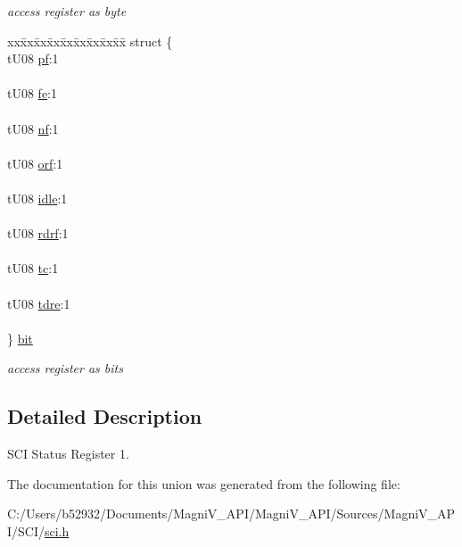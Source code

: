 \begin{DoxyCompactItemize}
\begin{DoxyCompactList}\small\item\em access register as byte \end{DoxyCompactList}\item 
\hypertarget{unionu_s_c_i_s_r1_af10465d89ce333e4ef332f8f26df7bd9}{}\begin{tabbing}
xx\=xx\=xx\=xx\=xx\=xx\=xx\=xx\=xx\=\kill
struct \{\\
\>tU08 \hyperlink{unionu_s_c_i_s_r1_ab24d201d9fd57b39dd89bdbecd818561}{pf}:1\\
\>\\
\>tU08 \hyperlink{unionu_s_c_i_s_r1_a362e404d79824e06ec4b237f39bfd3ac}{fe}:1\\
\>\\
\>tU08 \hyperlink{unionu_s_c_i_s_r1_aae4204ad463bba316ec6aec06139b62c}{nf}:1\\
\>\\
\>tU08 \hyperlink{unionu_s_c_i_s_r1_af7a41fa69451b08caba2c320109d1a28}{orf}:1\\
\>\\
\>tU08 \hyperlink{unionu_s_c_i_s_r1_ac6af6cb95c9bba62681458e82f019e50}{idle}:1\\
\>\\
\>tU08 \hyperlink{unionu_s_c_i_s_r1_a7c3de9ce073d51c2aa88515cbe0bc522}{rdrf}:1\\
\>\\
\>tU08 \hyperlink{unionu_s_c_i_s_r1_a41bfdbdd12d2fbf2fbb2d42f1987f1dd}{tc}:1\\
\>\\
\>tU08 \hyperlink{unionu_s_c_i_s_r1_a5ee47374285f221e3834cdc842d56fad}{tdre}:1\\
\>\\
\} \hyperlink{unionu_s_c_i_s_r1_af10465d89ce333e4ef332f8f26df7bd9}{bit}\label{unionu_s_c_i_s_r1_af10465d89ce333e4ef332f8f26df7bd9}
\\

\end{tabbing}\begin{DoxyCompactList}\small\item\em access register as bits \end{DoxyCompactList}\end{DoxyCompactItemize}


\subsection{Detailed Description}
S\+C\+I Status Register 1. 

The documentation for this union was generated from the following file\+:\begin{DoxyCompactItemize}
\item 
C\+:/\+Users/b52932/\+Documents/\+Magni\+V\+\_\+\+A\+P\+I/\+Magni\+V\+\_\+\+A\+P\+I/\+Sources/\+Magni\+V\+\_\+\+A\+P\+I/\+S\+C\+I/\hyperlink{sci_8h}{sci.\+h}\end{DoxyCompactItemize}
